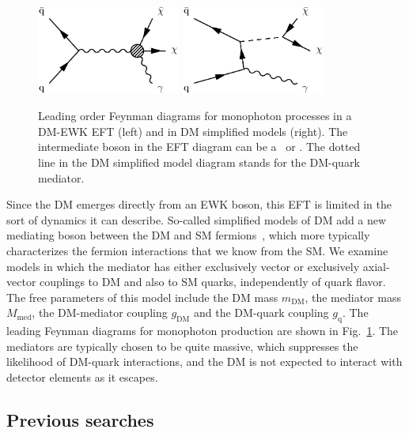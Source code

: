 \documentclass[oneside, letterpaper, 12pt, oldfontcommands]{memoir}
\begin{document}
\begin{figure}[hbtp]
  \begin{center}
    \includegraphics[width=0.42\textwidth]{Figures/dmewk.pdf}
    \includegraphics[width=0.42\textwidth]{Figures/dm.pdf}
    \caption{
      Leading order Feynman diagrams for monophoton processes in a DM-EWK EFT (left) and in DM simplified models (right).
      The intermediate boson in the EFT diagram can be a \PZ\ or \Pgamma. The dotted line in the DM simplified model diagram
      stands for the DM-quark mediator.
    }
    \label{fig:dm_diagrams}
  \end{center}
\end{figure}

Since the DM emerges directly from an EWK boson, this EFT is limited in the sort of dynamics it can describe. So-called simplified models of DM add
a new mediating boson between the DM and SM fermions~\cite{ref:1507.00966}, which more typically characterizes the fermion interactions that we know
from the SM. We examine models
in which the mediator has either exclusively vector or exclusively axial-vector couplings to DM and also to SM quarks, independently
of quark flavor. The free parameters of this model include
the DM mass $m_\mathrm{DM}$, the mediator mass $M_\mathrm{med}$, the DM-mediator coupling $g_\mathrm{DM}$ and the DM-quark coupling $g_\mathrm{q}$.
The leading Feynman diagrams for monophoton production are shown in Fig.~\ref{fig:dm_diagrams}. The mediators are typically chosen to be quite massive,
which suppresses the likelihood of DM-quark interactions, and the DM is not expected to interact with detector elements as it escapes.

\subsection{Previous searches} \label{sec:introduction_dm_previous_searches}
\end{document}
